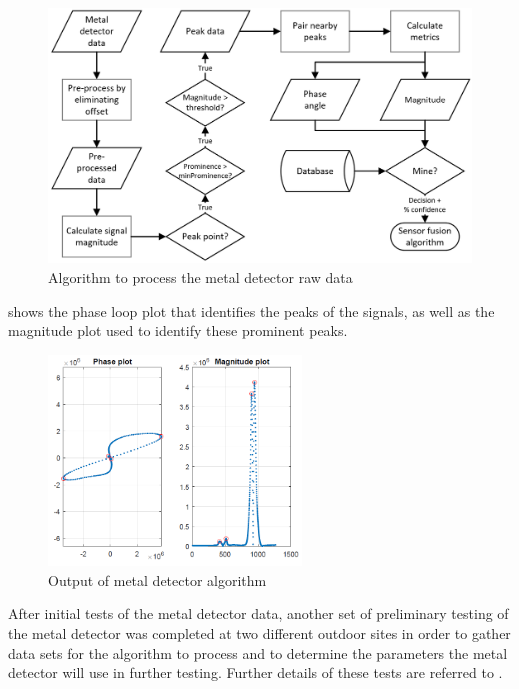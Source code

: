 \documentclass[main.tex]{subfiles}
\begin{document}
\begin{figure}[ht]
\includegraphics[width=\textwidth]{4-DetailedDesign/MDflow.PNG}
\centering
\caption{Algorithm to process the metal detector raw data}
\end{figure}

 shows the phase loop plot that identifies the peaks of the signals, as well as the magnitude plot used to identify these prominent peaks.

\begin{figure}[ht]
\includegraphics[width=0.6\textwidth]{4-DetailedDesign/phase.PNG}
\centering
\caption{Output of metal detector algorithm} 
\end{figure}

After initial tests of the metal detector data, another set of preliminary testing of the metal detector was completed at two different outdoor sites in order to gather data sets for the algorithm to process and to determine the parameters the metal detector will use in further testing. Further details of these tests are referred to . 
\end{document}
